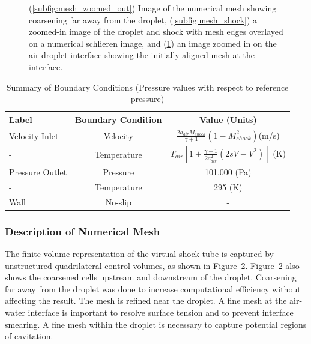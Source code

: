 \documentclass{UCF_ETD}
\begin{document}
\begin{figure}
\begin{subfigure}[]{0.49\textwidth}
        \caption{}
        \label{subfig:mesh_alignment}
    \end{subfigure}
\caption{ (\ref{subfig:mesh_zoomed_out}) Image of the numerical mesh showing coarsening far away from the droplet, (\ref{subfig:mesh_shock}) a zoomed-in image of the droplet and shock with mesh edges overlayed on a numerical schlieren image, and (\ref{subfig:mesh_alignment}) an image zoomed in on the air-droplet interface showing the initially aligned mesh at the interface.}
\label{fig:dropMesh}
\end{figure}

\begin{table}
\caption{\label{tab:boundaryConditions_shockDrop} Summary of Boundary Conditions (Pressure values with respect to reference pressure)}
\centering
\begin{tabular}{lcc}
\hline
Label & Boundary Condition& Value (Units)\\\hline
Velocity Inlet & Velocity & $\frac{2a_{air}M_{shock}}{\gamma +1} \left( 1- M_{shock}^{2}\right) $(m/s) \\
-& Temperature & $ T_{air}\left[ 1 + \frac{\gamma - 1}{2 a_{air}^2} \left( 2sV - V^{2} \right)  \right]$ (K)\\
Pressure Outlet & Pressure& 101,000 (Pa)\\
-& Temperature & 295 (K) \\
Wall& No-slip& -\\
\hline
\end{tabular}
\end{table}

\subsubsection{Description of Numerical Mesh}
\label{subsubsec:mesh}
The finite-volume representation of the virtual shock tube is captured by unstructured quadrilateral control-volumes, as shown in Figure~\ref{fig:dropMesh}. Figure~\ref{fig:dropMesh} also shows the coarsened cells upstream and downstream of the droplet. Coarsening far away from the droplet was done to increase computational efficiency without affecting the result. The mesh is refined near the droplet. A fine mesh at the air-water interface is important to resolve surface tension and to prevent interface smearing. A fine mesh within the droplet is necessary to capture potential regions of cavitation.
\end{document}
